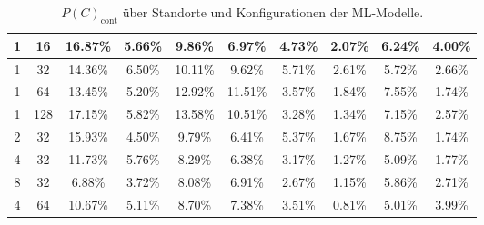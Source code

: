 \begin{table}
\begin{tabular}{ | c | c | c | c | c | c | c | c | c | c | }
        1 & 16 & 16.87\% & 5.66\% & 9.86\% & 6.97\% & 4.73\% & 2.07\% & 6.24\% & 4.00\% \\\hline
        1 & 32 & 14.36\% & 6.50\% & 10.11\% & 9.62\% & 5.71\% & 2.61\% & 5.72\% & 2.66\% \\\hline
        1 & 64 & 13.45\% & 5.20\% & 12.92\% & 11.51\% & 3.57\% & 1.84\% & 7.55\% & 1.74\% \\\hline
        1 & 128 & 17.15\% & 5.82\% & 13.58\% & 10.51\% & 3.28\% & 1.34\% & 7.15\% & 2.57\% \\\hline
        2 & 32 & 15.93\% & 4.50\% & 9.79\% & 6.41\% & 5.37\% & 1.67\% & 8.75\% & 1.74\% \\\hline
        4 & 32 & 11.73\% & 5.76\% & 8.29\% & 6.38\% & 3.17\% & 1.27\% & 5.09\% & 1.77\% \\\hline
        8 & 32 & 6.88\% & 3.72\% & 8.08\% & 6.91\% & 2.67\% & 1.15\% & 5.86\% & 2.71\% \\\hline
        4 & 64 & 10.67\% & 5.11\% & 8.70\% & 7.38\% & 3.51\% & 0.81\% & 5.01\% & 3.99\% \\\hline
    \end{tabular}
    \caption{$P(C)_{\text{cont}}$ über Standorte und Konfigurationen der ML-Modelle.}
    \label{tab:predictions_by_acc_pic_cont}
\end{table}
